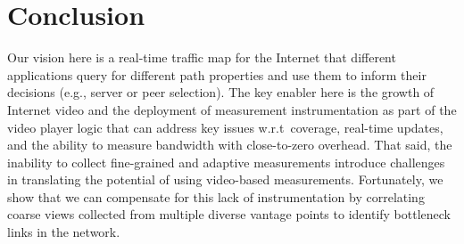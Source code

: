 \section{Conclusion}
\label{sec:concl}

 Our vision here is a real-time traffic map for the Internet that different
applications query for different path properties and use them to inform their
decisions (e.g., server or peer selection). The key enabler here is the growth
of Internet video and the deployment of measurement instrumentation as part of
the video player logic that can address key issues w.r.t\ coverage, real-time
updates, and the ability to measure bandwidth with close-to-zero overhead. That
said, the inability to collect fine-grained and adaptive measurements introduce
challenges in translating the potential of using video-based measurements.
Fortunately, we show that we can compensate for this lack of  instrumentation
by correlating coarse views collected from multiple diverse vantage points to
identify bottleneck links in the network. 
